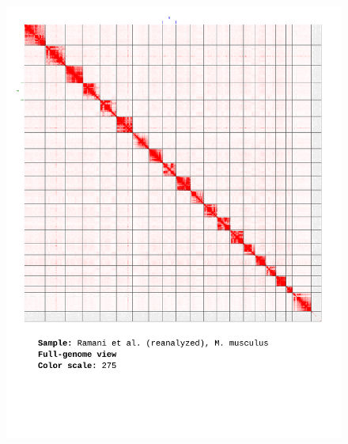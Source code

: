 \documentclass[a4paper,14pt]{extarticle}
\begin{document}
\begin{figure}[hp!] \includegraphics[width=1\textwidth]{ramani-brain_ALL_275.pdf} \end{figure}
\end{document}
